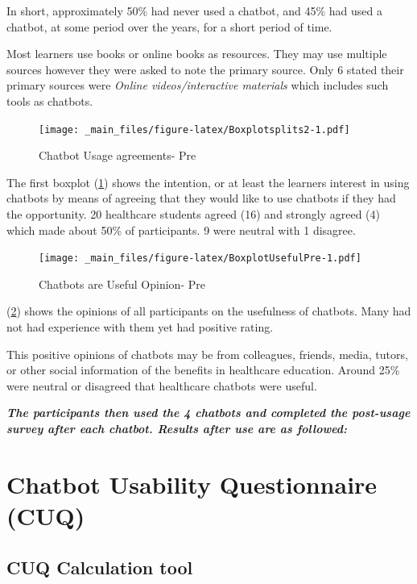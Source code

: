 \documentclass[a4paper, nobind]{templates/ociamthesis}
\begin{document}
In short, approximately 50\% had never used a chatbot, and 45\% had used a
chatbot, at some period over the years, for a short period of time.

Most learners use books or online books as resources. They may use multiple sources however they were asked to note the primary source. Only 6 stated their primary sources were \emph{Online videos/interactive materials} which includes such tools as chatbots.

\begin{figure}
\centering
\texttt{[image: \_main\_files/figure-latex/Boxplotsplits2-1.pdf]}
\caption{\label{fig:Boxplotsplits2}Chatbot Usage agreements- Pre}
\end{figure}

The first boxplot (\ref{fig:Boxplotsplits2}) shows the intention, or at least the learners interest in using chatbots by means of agreeing that they would like to use chatbots if they had the opportunity. 20 healthcare students agreed (16) and strongly agreed (4) which made about 50\% of participants. 9 were neutral with 1 disagree.

\begin{figure}
\centering
\texttt{[image: \_main\_files/figure-latex/BoxplotUsefulPre-1.pdf]}
\caption{\label{fig:BoxplotUsefulPre}Chatbots are Useful Opinion- Pre}
\end{figure}

(\ref{fig:BoxplotUsefulPre}) shows the opinions of all participants on the usefulness of chatbots. Many had not had experience with them yet had positive rating.

This positive opinions of chatbots may be from colleagues, friends, media, tutors, or other social information of the benefits in healthcare education. Around 25\% were neutral or disagreed that healthcare chatbots were useful.

\textbf{\emph{The participants then used the 4 chatbots and completed the post-usage survey after each chatbot. Results after use are as followed:}}

\hypertarget{chatbot-usability-questionnaire-cuq}{%
\section{Chatbot Usability Questionnaire (CUQ)}\label{chatbot-usability-questionnaire-cuq}}

\hypertarget{cuq-calculation-tool}{%
\subsection{CUQ Calculation tool}\label{cuq-calculation-tool}}
\end{document}
